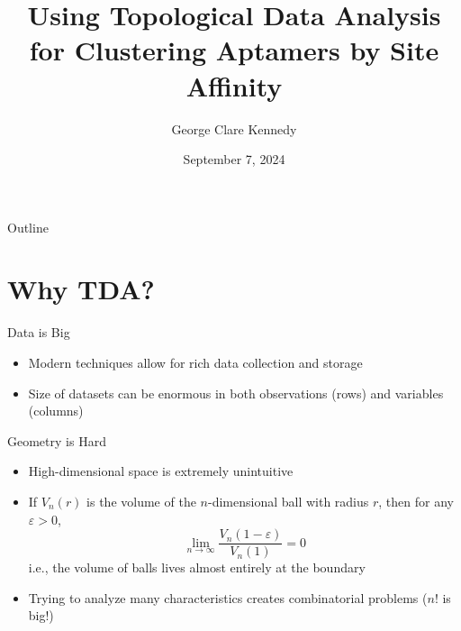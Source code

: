 \documentclass{beamer}
\title{Using Topological Data Analysis for Clustering Aptamers by Site Affinity}
\date{September 7, 2024}
\author{George Clare Kennedy}
\institute{University of Iowa}
\begin{document}
\begin{frame}
  \titlepage
\end{frame}
\begin{frame}{Outline}
  \tableofcontents[hideallsubsections]
\end{frame}

\section{Why TDA?}

\begin{frame}{Data is Big}
  \begin{itemize}
    \item Modern techniques allow for rich data collection and storage
    \item Size of datasets can be enormous in both observations (rows) and variables (columns)
  \end{itemize}
\end{frame}

\begin{frame}{Geometry is Hard}
  \begin{itemize}
    \item High-dimensional space is extremely unintuitive
    \item If $V_n(r)$ is the volume of the $n$-dimensional ball with radius $r$, then for any $\varepsilon>0$, $$\lim_{n\to\infty}\frac{V_n(1-\varepsilon)}{V_n(1)}=0$$ i.e., the volume of balls lives almost entirely at the boundary
    \item Trying to analyze many characteristics creates combinatorial problems ($n!$ is big!)
  \end{itemize}
  
\end{frame}
\end{document}
